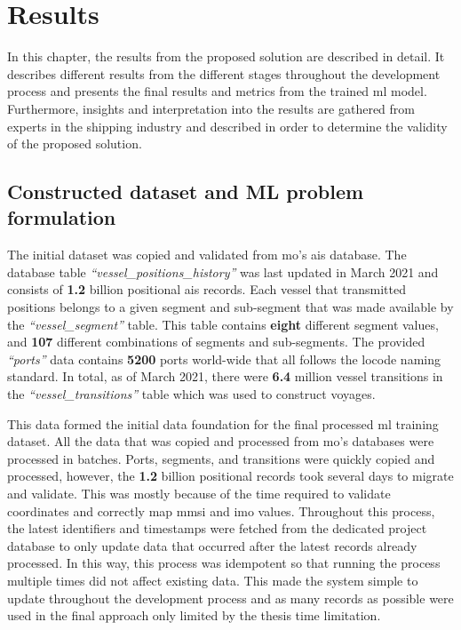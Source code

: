 \chapter{Results}
\label{chap:results}

In this chapter, the results from the proposed solution are described in detail. It describes different results from the different stages throughout the development process and presents the final results and metrics from the trained \acrfull{ml} model. Furthermore, insights and interpretation into the results are gathered from experts in the shipping industry and described in order to determine the validity of the proposed solution.

\section{Constructed dataset and ML problem formulation}

The initial dataset was copied and validated from \acrfull{mo}'s \acrshort{ais} database. The database table \textit{``vessel\_positions\_history''} was last updated in March 2021 and consists of \textbf{1.2} billion positional \acrshort{ais} records. Each vessel that transmitted positions belongs to a given segment and sub-segment that was made available by the \textit{``vessel\_segment''} table. This table contains \textbf{eight} different segment values, and \textbf{107} different combinations of segments and sub-segments. The provided \textit{``ports''} data contains \textbf{5200} ports world-wide that all follows the \gls{locode} naming standard. In total, as of March 2021, there were \textbf{6.4} million vessel transitions in the \textit{``vessel\_transitions''} table which was used to construct voyages.

This data formed the initial data foundation for the final processed \acrfull{ml} training dataset. All the data that was copied and processed from \acrshort{mo}'s databases were processed in batches. Ports, segments, and transitions were quickly copied and processed, however, the \textbf{1.2} billion positional records took several days to migrate and validate. This was mostly because of the time required to validate coordinates and correctly map \acrshort{mmsi} and \acrshort{imo} values. Throughout this process, the latest identifiers and timestamps were fetched from the dedicated project database to only update data that occurred after the latest records already processed. In this way, this process was idempotent so that running the process multiple times did not affect existing data. This made the system simple to update throughout the development process and as many records as possible were used in the final approach only limited by the thesis time limitation.

